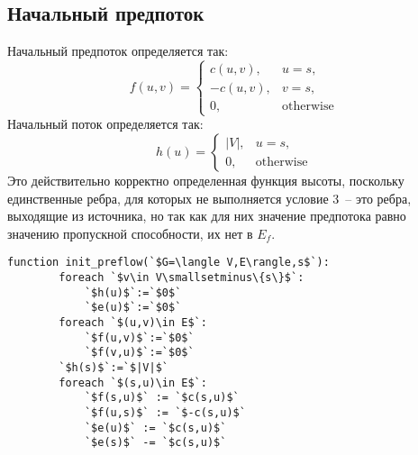 \subsection{Начальный предпоток}
Начальный предпоток определяется так:
$$
f(u,v)=\begin{cases}
	c(u,v), & u=s,\\
	-c(u,v), & v=s,\\
	0, & \mathrm{otherwise}
\end{cases}
$$
Начальный поток определяется так:
$$
h(u)=\begin{cases}
|V|, & u=s,\\
0, & \mathrm{otherwise}
\end{cases}
$$
Это действительно корректно определенная функция высоты, поскольку единственные ребра, для которых не выполняется условие 3~-- это ребра, выходящие из источника, но так как для них значение предпотока равно значению пропускной способности, их нет в $E_f$.
\begin{lstlisting}[escapeinside=``]
	function init_preflow(`$G=\langle V,E\rangle,s$`):
		foreach `$v\in V\smallsetminus\{s\}$`:
			`$h(u)$`:=`$0$`
			`$e(u)$`:=`$0$`
		foreach `$(u,v)\in E$`:
			`$f(u,v)$`:=`$0$`
			`$f(v,u)$`:=`$0$`
		`$h(s)$`:=`$|V|$`
		foreach `$(s,u)\in E$`:
			`$f(s,u)$` := `$c(s,u)$`
			`$f(u,s)$` := `$-c(s,u)$`
			`$e(u)$` := `$c(s,u)$`
			`$e(s)$` -= `$c(s,u)$`
\end{lstlisting}

